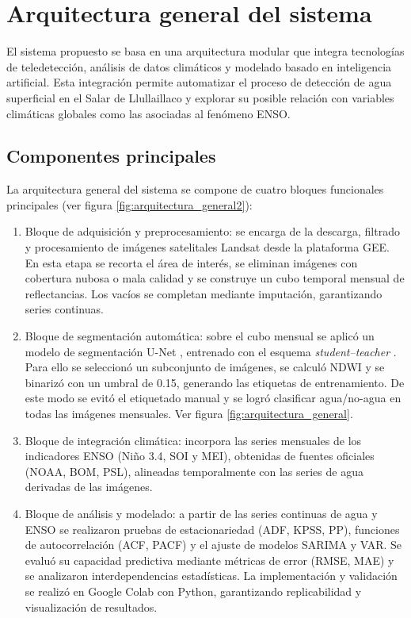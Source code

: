 \newpage
\section{Arquitectura general del sistema}

El sistema propuesto se basa en una arquitectura modular que integra tecnologías de teledetección, análisis de datos climáticos y modelado basado en inteligencia artificial. Esta integración permite automatizar el proceso de detección de agua superficial en el Salar de Llullaillaco y explorar su posible relación con variables climáticas globales como las asociadas al fenómeno ENSO.

\subsection{Componentes principales}

La arquitectura general del sistema se compone de cuatro bloques funcionales principales (ver figura \ref{fig:arquitectura_general2}):

\begin{enumerate}
    \item Bloque de adquisición y preprocesamiento: se encarga de la descarga, filtrado y procesamiento de imágenes satelitales Landsat desde la plataforma GEE. En esta etapa se recorta el área de interés, se eliminan imágenes con cobertura nubosa o mala calidad y se construye un cubo temporal mensual de reflectancias. Los vacíos se completan mediante imputación, garantizando series continuas.

    \item Bloque de segmentación automática: sobre el cubo mensual se aplicó un modelo de segmentación U-Net \citep{ronneberger2015unet}, entrenado con el esquema \textit{student–teacher} \citep{hinton2015distilling}. Para ello se seleccionó un subconjunto de imágenes, se calculó NDWI y se binarizó con un umbral de 0.15, generando las etiquetas de entrenamiento. De este modo se evitó el etiquetado manual y se logró clasificar agua/no-agua en todas las imágenes mensuales. Ver figura \ref{fig:arquitectura_general}.

    \item Bloque de integración climática: incorpora las series mensuales de los indicadores ENSO (Niño 3.4, SOI y MEI), obtenidas de fuentes oficiales (NOAA, BOM, PSL), alineadas temporalmente con las series de agua derivadas de las imágenes.

    \item Bloque de análisis y modelado: a partir de las series continuas de agua y ENSO se realizaron pruebas de estacionariedad (ADF, KPSS, PP), funciones de autocorrelación (ACF, PACF) y el ajuste de modelos SARIMA y VAR. Se evaluó su capacidad predictiva mediante métricas de error (RMSE, MAE) y se analizaron interdependencias estadísticas. La implementación y validación se realizó en Google Colab con Python, garantizando replicabilidad y visualización de resultados.
\end{enumerate}

